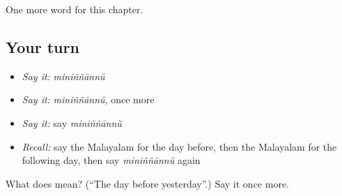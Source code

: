\begin{grammarlens}[title={What you've built}]
One more word for this chapter.
\end{grammarlens}

\subsection*{Your turn}
\begin{itemize}
\raggedright
  \item \emph{Say it:} \emph{miniññānnŭ}
  \item \emph{Say it:} \emph{miniññānnŭ}, once more
  \item \emph{Say it:} say \emph{miniññānnŭ}
  \item \emph{Recall:} say the Malayalam for the day before, then the Malayalam for the following day, then say \emph{miniññānnŭ} again
\end{itemize}

\begin{tcolorbox}[breakable,colback=teal!4,colframe=teal!35!black,title={Before you move on}]
What does  mean? (\textquotedblleft{}The day before yesterday\textquotedblright{}.) Say it once more.
\end{tcolorbox}
